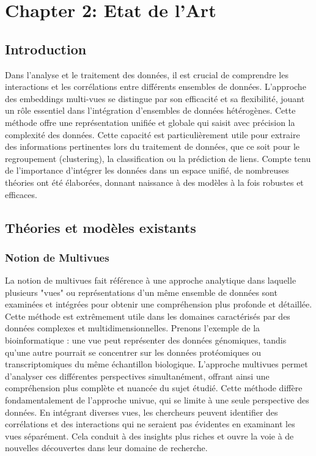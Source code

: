 \setcounter{secnumdepth}{2}


\chapter{Chapter 2: Etat de l'Art}

    \section{Introduction}
    Dans l'analyse et le traitement des données, il est crucial de comprendre les interactions et les corrélations entre différents ensembles de données. L'approche des embeddings multi-vues se distingue par son efficacité et sa flexibilité, jouant un rôle essentiel dans l'intégration d'ensembles de données hétérogènes. Cette méthode offre une représentation unifiée et globale qui saisit avec précision la complexité des données. Cette capacité est particulièrement utile pour extraire des informations pertinentes lors du traitement de données, que ce soit pour le regroupement (clustering), la classification ou la prédiction de liens. Compte tenu de l'importance d'intégrer les données dans un espace unifié, de nombreuses théories ont été élaborées, donnant naissance à des modèles à la fois robustes et efficaces.
    
    \section{Théories et modèles existants}  
   
        \subsection{Notion de Multivues}
            La notion de multivues fait référence à une approche analytique dans laquelle plusieurs "vues" ou représentations d'un même ensemble de données sont examinées et intégrées pour obtenir une compréhension plus profonde et détaillée. Cette méthode est extrêmement utile dans les domaines caractérisés par des données complexes et multidimensionnelles. Prenons l'exemple de la bioinformatique : une vue peut représenter des données génomiques, tandis qu'une autre pourrait se concentrer sur les données protéomiques ou transcriptomiques du même échantillon biologique. L'approche multivues permet d'analyser ces différentes perspectives simultanément, offrant ainsi une compréhension plus complète et nuancée du sujet étudié. Cette méthode diffère fondamentalement de l'approche univue, qui se limite à une seule perspective des données. En intégrant diverses vues, les chercheurs peuvent identifier des corrélations et des interactions qui ne seraient pas évidentes en examinant les vues séparément. Cela conduit à des insights plus riches et ouvre la voie à de nouvelles découvertes dans leur domaine de recherche.
            
